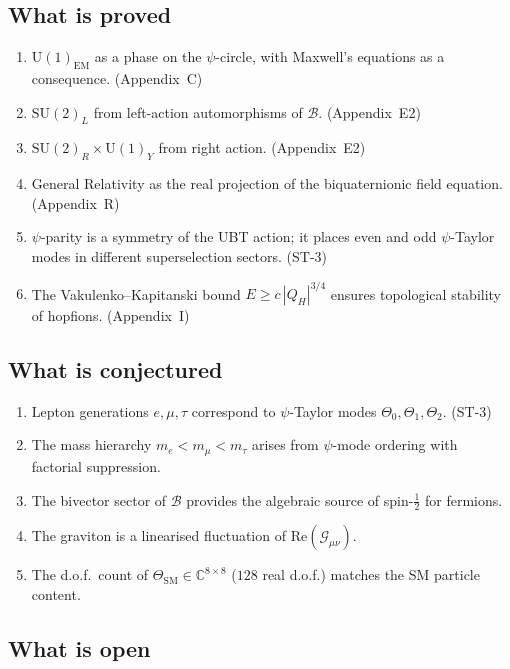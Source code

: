 \documentclass[12pt,a4paper]{article}
\theoremstyle{remark}
\newcommand{\B}{\mathcal{B}}
\newcommand{\C}{\mathbb{C}}
\newcommand{\re}{\mathrm{Re}}
\begin{document}
\subsection{What is proved}

\begin{enumerate}[label=(\alph*)]
  \item $\mathrm{U}(1)_{\mathrm{EM}}$ as a phase on the $\psi$-circle,
        with Maxwell's equations as a consequence.  (Appendix~C)
  \item $\mathrm{SU}(2)_L$ from left-action automorphisms of $\B$.
        (Appendix~E2)
  \item $\mathrm{SU}(2)_R\times\mathrm{U}(1)_Y$ from right action.
        (Appendix~E2)
  \item General Relativity as the real projection of the biquaternionic
        field equation.  (Appendix~R)
  \item $\psi$-parity is a symmetry of the UBT action; it places even and
        odd $\psi$-Taylor modes in different superselection sectors.
        (ST-3)
  \item The Vakulenko--Kapitanski bound $E\ge c\,|Q_H|^{3/4}$ ensures
        topological stability of hopfions.  (Appendix~I)
\end{enumerate}

\subsection{What is conjectured}

\begin{enumerate}[label=(\alph*)]
  \item Lepton generations $e,\mu,\tau$ correspond to $\psi$-Taylor modes
        $\Theta_0,\Theta_1,\Theta_2$.  (ST-3)
  \item The mass hierarchy $m_e < m_\mu < m_\tau$ arises from $\psi$-mode
        ordering with factorial suppression.
  \item The bivector sector of $\B$ provides the algebraic source of spin-$\tfrac{1}{2}$
        for fermions.
  \item The graviton is a linearised fluctuation of $\re(\mathcal{G}_{\mu\nu})$.
  \item The d.o.f.\ count of $\Theta_{\mathrm{SM}}\in\C^{8\times 8}$ ($128$
        real d.o.f.) matches the SM particle content.
\end{enumerate}

\subsection{What is open}
\end{document}

